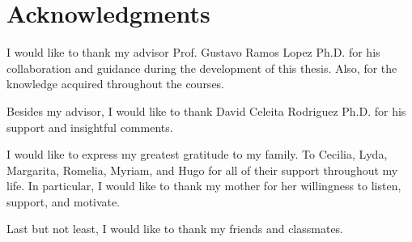 \chapter*{Acknowledgments}

I would like to thank my advisor Prof. Gustavo Ramos Lopez Ph.D. for his collaboration and guidance during the development of this thesis. Also, for the knowledge acquired throughout the courses.

Besides my advisor, I would like to thank David Celeita Rodriguez Ph.D. for his support and insightful comments.

I would like to express my greatest gratitude to my family. To Cecilia, Lyda, Margarita, Romelia, Myriam, and Hugo for all of their support throughout my life. 
In particular, I would like to thank my mother for her willingness to listen, support, and motivate.

Last but not least, I would like to thank my friends and classmates. 

